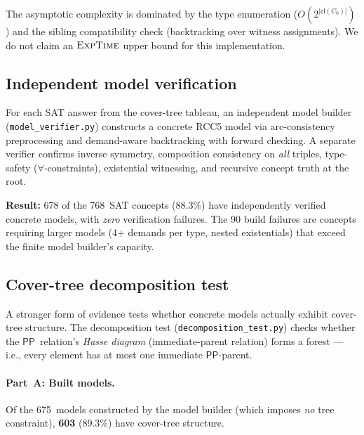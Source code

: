 \documentclass[a4paper,11pt]{article}
\theoremstyle{definition}
\newcommand{\PP}{\ensuremath{\mathsf{PP}}}
\newcommand{\cl}{\ensuremath{\mathsf{cl}}}
\newcommand{\EXPTIME}{\textsc{ExpTime}}
\begin{document}
The asymptotic complexity is dominated by the type enumeration
($O(2^{|\cl(C_0)|})$) and the sibling compatibility check
(backtracking over witness assignments).  We do not claim an
$\EXPTIME$ upper bound for this implementation.

\subsection{Independent model verification}

For each SAT answer from the cover-tree tableau, an independent
model builder (\texttt{model\_verifier.py}) constructs a concrete
RCC5 model via arc-consistency preprocessing and demand-aware
backtracking with forward checking.  A separate verifier confirms
inverse symmetry, composition consistency on \emph{all} triples,
type-safety ($\forall$-constraints), existential witnessing, and
recursive concept truth at the root.

\textbf{Result:} 678 of the 768~SAT concepts (88.3\%) have
independently verified concrete models, with \emph{zero}
verification failures.  The 90 build failures are concepts
requiring larger models (4+ demands per type, nested existentials)
that exceed the finite model builder's capacity.

\subsection{Cover-tree decomposition test}
\label{sec:decomposition}

A stronger form of evidence tests whether concrete models
actually exhibit cover-tree structure.  The decomposition test
(\texttt{decomposition\_test.py}) checks whether the $\PP$~relation's
\emph{Hasse diagram} (immediate-parent relation) forms a forest
--- i.e., every element has at most one immediate $\PP$-parent.

\paragraph{Part~A: Built models.}
Of the 675~models constructed by the model builder
(which imposes \emph{no} tree constraint), \textbf{603} (89.3\%)
have cover-tree structure.
\end{document}
